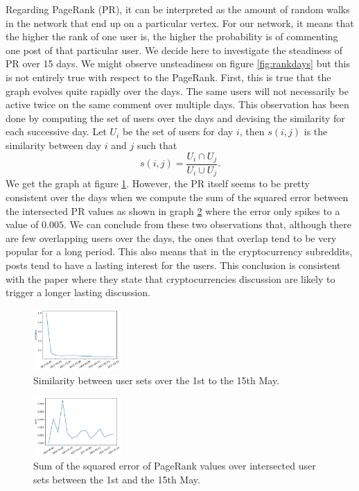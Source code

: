 Regarding PageRank (PR), it can be interpreted as the amount of random walks in the network that end up on a particular vertex. For our network, it means that the higher the rank of one user is, the higher the probability is of commenting one post of that particular user. We decide here to investigate the steadiness of PR over 15 days. We might observe unsteadiness on figure \ref{fig:rankdays} but this is not entirely true with respect to the PageRank. First, this is true that the graph evolves quite rapidly over the days. The same users will not necessarily be active twice on the same comment over multiple days. This observation has been done by computing the set of users over the days and devising the similarity for each successive day. Let $U_i$ be the set of users for day $i$, then $s\left(i,j\right)$ is the similarity between day $i$ and $j$ such that $$s\left(i,j\right)=\frac{U_i\cap U_{j}}{U_i\cup U_{j}}.$$ We get the graph at figure \ref{fig:simdays}. However, the PR itself seems to be pretty consistent over the days when we compute the sum of the squared error between the intersected PR values as shown in graph \ref{fig:errordays} where the error only spikes to a value of $0.005$. We can conclude from these two observations that, although there are few overlapping users over the days, the ones that overlap tend to be very popular for a long period. This also means that in the cryptocurrency subreddits, posts tend to have a lasting interest for the users. This conclusion is consistent with the paper \cite{glenskiCharacterizingSpeedScale2019} where they state that cryptocurrencies discussion are likely to trigger a longer lasting discussion.
\begin{figure}[H]
    \centering
    \includegraphics[width=0.3\textwidth]{figures/sim_days.pdf}
    \caption{Similarity between user sets over the 1st to the 15th May.}
    \label{fig:simdays}
\end{figure}
\begin{figure}[H]
    \centering
    \includegraphics[width=0.3\textwidth]{figures/error_days.pdf}
    \caption{Sum of the squared error of PageRank values over intersected user sets between the 1st and the 15th May.}
    \label{fig:errordays}
\end{figure}


